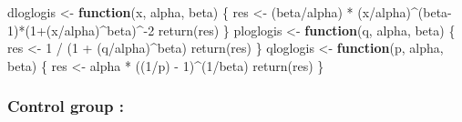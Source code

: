 \documentclass[
]{article}
\newenvironment{Shaded}{\begin{snugshade}}{\end{snugshade}}
\newcommand{\AttributeTok}[1]{\textcolor[rgb]{0.77,0.63,0.00}{#1}}
\newcommand{\CommentTok}[1]{\textcolor[rgb]{0.56,0.35,0.01}{\textit{#1}}}
\newcommand{\ControlFlowTok}[1]{\textcolor[rgb]{0.13,0.29,0.53}{\textbf{#1}}}
\newcommand{\DecValTok}[1]{\textcolor[rgb]{0.00,0.00,0.81}{#1}}
\newcommand{\FunctionTok}[1]{\textcolor[rgb]{0.00,0.00,0.00}{#1}}
\newcommand{\NormalTok}[1]{#1}
\newcommand{\OtherTok}[1]{\textcolor[rgb]{0.56,0.35,0.01}{#1}}
\newcommand{\SpecialCharTok}[1]{\textcolor[rgb]{0.00,0.00,0.00}{#1}}
\newcommand{\StringTok}[1]{\textcolor[rgb]{0.31,0.60,0.02}{#1}}
\begin{document}
\begin{Shaded}
\begin{Highlighting}[]
\NormalTok{dloglogis }\OtherTok{\textless{}{-}} \ControlFlowTok{function}\NormalTok{(x, alpha, beta) \{}
\NormalTok{  res }\OtherTok{\textless{}{-}}\NormalTok{ (beta}\SpecialCharTok{/}\NormalTok{alpha) }\SpecialCharTok{*}\NormalTok{ (x}\SpecialCharTok{/}\NormalTok{alpha)}\SpecialCharTok{\^{}}\NormalTok{(beta}\DecValTok{{-}1}\NormalTok{)}\SpecialCharTok{*}\NormalTok{(}\DecValTok{1}\SpecialCharTok{+}\NormalTok{(x}\SpecialCharTok{/}\NormalTok{alpha)}\SpecialCharTok{\^{}}\NormalTok{beta)}\SpecialCharTok{\^{}{-}}\DecValTok{2}
  \FunctionTok{return}\NormalTok{(res)}
\NormalTok{\}}
\NormalTok{ploglogis }\OtherTok{\textless{}{-}} \ControlFlowTok{function}\NormalTok{(q, alpha, beta) \{}
\NormalTok{  res }\OtherTok{\textless{}{-}} \DecValTok{1} \SpecialCharTok{/}\NormalTok{ (}\DecValTok{1} \SpecialCharTok{+}\NormalTok{ (q}\SpecialCharTok{/}\NormalTok{alpha)}\SpecialCharTok{\^{}}\NormalTok{beta)}
  \FunctionTok{return}\NormalTok{(res)}
\NormalTok{\}}
\NormalTok{qloglogis }\OtherTok{\textless{}{-}} \ControlFlowTok{function}\NormalTok{(p, alpha, beta) \{}
\NormalTok{  res }\OtherTok{\textless{}{-}}\NormalTok{ alpha }\SpecialCharTok{*}\NormalTok{ ((}\DecValTok{1}\SpecialCharTok{/}\NormalTok{p) }\SpecialCharTok{{-}} \DecValTok{1}\NormalTok{)}\SpecialCharTok{\^{}}\NormalTok{(}\DecValTok{1}\SpecialCharTok{/}\NormalTok{beta)}
  \FunctionTok{return}\NormalTok{(res)}
\NormalTok{\}}
\end{Highlighting}
\end{Shaded}

\hypertarget{control-group}{%
\subsubsection{Control group :}\label{control-group}}

\begin{Shaded}
\end{Shaded}
\end{document}
